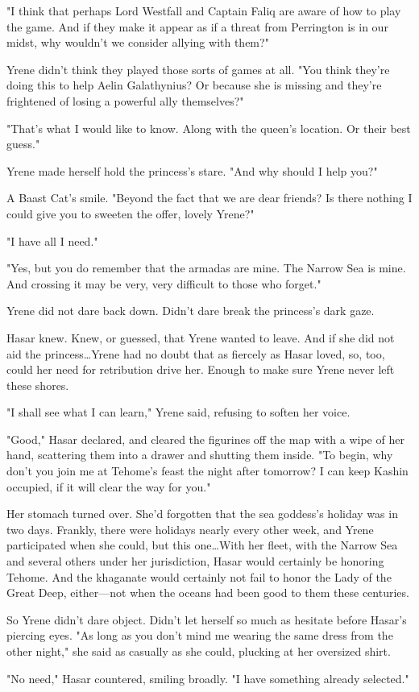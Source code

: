 "I think that perhaps Lord Westfall and Captain Faliq are aware of how to play the game.
And if they make it appear as if a threat from Perrington is in our midst, why wouldn't we consider allying with them?"

Yrene didn't think they played those sorts of games at all.
"You think they're doing this to help Aelin Galathynius?
Or because she is missing and they're frightened of losing a powerful ally themselves?"

"That's what I would like to know.
Along with the queen's location.
Or their best guess."

Yrene made herself hold the princess's stare.
"And why should I help you?"

A Baast Cat's smile.
"Beyond the fact that we are dear friends?
Is there nothing I could give you to sweeten the offer, lovely Yrene?"

"I have all I need."

"Yes, but you do remember that the armadas are mine.
The Narrow Sea is mine.
And crossing it may be very, very difficult to those who forget."

Yrene did not dare back down.
Didn't dare break the princess's dark gaze.

Hasar knew.
Knew, or guessed, that Yrene wanted to leave.
And if she did not aid the princess\ldots Yrene had no doubt that as fiercely as Hasar loved, so, too, could her need for retribution drive her.
Enough to make sure Yrene never left these shores.

"I shall see what I can learn," Yrene said, refusing to soften her voice.

"Good," Hasar declared, and cleared the figurines off the map with a wipe of her hand, scattering them into a drawer and shutting them inside.
"To begin, why don't you join me at Tehome's feast the night after tomorrow?
I can keep Kashin occupied, if it will clear the way for you."

Her stomach turned over.
She'd forgotten that the sea goddess's holiday was in two days.
Frankly, there were holidays nearly every other week, and Yrene participated when she could, but this one\ldots With her fleet, with the Narrow Sea and several others under her jurisdiction, Hasar would certainly be honoring Tehome.
And the khaganate would certainly not fail to honor the Lady of the Great Deep, either---not when the oceans had been good to them these centuries.

So Yrene didn't dare object.
Didn't let herself so much as hesitate before Hasar's piercing eyes.
"As long as you don't mind me wearing the same dress from the other night," she said as casually as she could, plucking at her oversized shirt.

"No need," Hasar countered, smiling broadly.
"I have something already selected."

